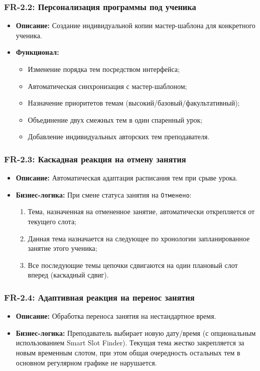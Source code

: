 \documentclass[12pt,a4paper]{article}
\begin{document}
\subsubsection*{FR-2.2: Персонализация программы под ученика}
\begin{itemize}
    \item \textbf{Описание:} Создание индивидуальной копии мастер-шаблона для конкретного ученика.
    \item \textbf{Функционал:}
          \begin{itemize}[label=---]
              \item Изменение порядка тем посредством интерфейса;
              \item Автоматическая синхронизация с мастер-шаблоном;
              \item Назначение приоритетов темам (высокий/базовый/факультативный);
              \item Объединение двух смежных тем в один спаренный урок;
              \item Добавление индивидуальных авторских тем преподавателя.
          \end{itemize}
\end{itemize}

\subsubsection*{FR-2.3: Каскадная реакция на отмену занятия}
\begin{itemize}
    \item \textbf{Описание:} Автоматическая адаптация расписания тем при срыве урока.
    \item \textbf{Бизнес-логика:} При смене статуса занятия на \texttt{Отменено}:
          \begin{enumerate}
              \item Тема, назначенная на отмененное занятие, автоматически открепляется от текущего слота;
              \item Данная тема назначается на следующее по хронологии запланированное занятие этого ученика;
              \item Все последующие темы цепочки сдвигаются на один плановый слот вперед (каскадный сдвиг).
          \end{enumerate}
\end{itemize}

\subsubsection*{FR-2.4: Адаптивная реакция на перенос занятия}
\begin{itemize}
    \item \textbf{Описание:} Обработка переноса занятия на нестандартное время.
    \item \textbf{Бизнес-логика:} Преподаватель выбирает новую дату/время (с опциональным использованием Smart Slot Finder). Текущая тема жестко закрепляется за новым временным слотом, при этом общая очередность остальных тем в основном регулярном графике не нарушается.
\end{itemize}
\end{document}
